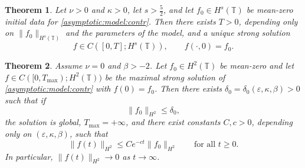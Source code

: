 \documentclass[10pt,a4paper]{amsart}
\newtheorem{theorem}{Theorem}
\newcommand{\TT}{\mathbb T}
\begin{document}
\begin{theorem}\label{th:existence:strong}
	Let $\nu>0$ and $\kappa>0$, let $s>\frac{5}{2}$, and let $f_0\in H^s(\TT)$ be mean-zero initial data for \eqref{asymptotic:model:contr}.
	Then there exists $T>0$, depending only on $\|f_0\|_{H^s(\TT)}$ and the parameters of the model, and a unique strong solution
	\[
	f\in C([0,T];H^s(\TT)),\qquad f(\cdot,0)=f_0.
	\]
\end{theorem}

\begin{theorem}\label{th:bbm-global}
	Assume $\nu=0$ and $\beta>-2$. Let $f_0\in H^2(\TT)$ be mean-zero and let
	$f\in C([0,T_{\max});H^2(\TT))$ be the maximal strong solution of \eqref{asymptotic:model:contr} with $f(0)=f_0$. Then there exists $\delta_0=\delta_0(\varepsilon,\kappa,\beta)>0$ such that if
	\[
	\|f_0\|_{H^2}\le \delta_0,
	\]
	the solution is global, $T_{\max}=+\infty$, and there exist constants $C,c>0$, depending only on
	$(\varepsilon,\kappa,\beta)$, such that
	\[
	\|f(t)\|_{H^2}\le C e^{-ct}\|f_0\|_{H^2}\qquad\text{for all }t\ge 0.
	\]
	In particular, $\|f(t)\|_{H^2}\to 0$ as $t\to\infty$.
\end{theorem}
\end{document}
